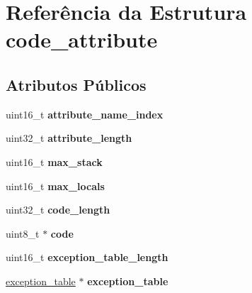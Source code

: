 \hypertarget{structcode__attribute}{\section{Referência da Estrutura code\-\_\-attribute}
\label{structcode__attribute}
}
\subsection*{Atributos Públicos}
\begin{DoxyCompactItemize}
\item 
\hypertarget{structcode__attribute_a8f7de380e61fc335a0301ee2b7ab4eb3}{uint16\-\_\-t {\bfseries attribute\-\_\-name\-\_\-index}}\label{structcode__attribute_a8f7de380e61fc335a0301ee2b7ab4eb3}

\item 
\hypertarget{structcode__attribute_ac4a01a30599eafbffefb2a17486129c6}{uint32\-\_\-t {\bfseries attribute\-\_\-length}}\label{structcode__attribute_ac4a01a30599eafbffefb2a17486129c6}

\item 
\hypertarget{structcode__attribute_af00861e5302338174f011333662e2bea}{uint16\-\_\-t {\bfseries max\-\_\-stack}}\label{structcode__attribute_af00861e5302338174f011333662e2bea}

\item 
\hypertarget{structcode__attribute_a6648b6b3867c9b07477e1cd489848165}{uint16\-\_\-t {\bfseries max\-\_\-locals}}\label{structcode__attribute_a6648b6b3867c9b07477e1cd489848165}

\item 
\hypertarget{structcode__attribute_a3e43573ef20a7ac5866605309186fc7b}{uint32\-\_\-t {\bfseries code\-\_\-length}}\label{structcode__attribute_a3e43573ef20a7ac5866605309186fc7b}

\item 
\hypertarget{structcode__attribute_ae333eaaba0615c3f8c23259a3b9753cd}{uint8\-\_\-t $\ast$ {\bfseries code}}\label{structcode__attribute_ae333eaaba0615c3f8c23259a3b9753cd}

\item 
\hypertarget{structcode__attribute_a25a9875fe7b1a080c79b878b47e74fb0}{uint16\-\_\-t {\bfseries exception\-\_\-table\-\_\-length}}\label{structcode__attribute_a25a9875fe7b1a080c79b878b47e74fb0}

\item 
\hypertarget{structcode__attribute_a49bc04662c2b5f84e5996d3c245fa34b}{\hyperlink{structexception__table}{exception\-\_\-table} $\ast$ {\bfseries exception\-\_\-table}}\label{structcode__attribute_a49bc04662c2b5f84e5996d3c245fa34b}


\end{DoxyCompactItemize}
